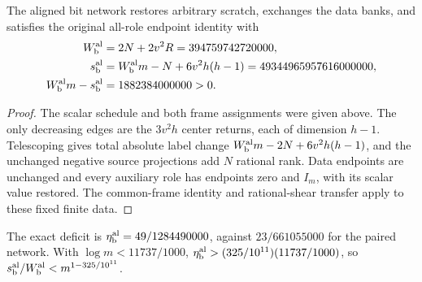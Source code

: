 \begin{proposition}\label{prop:aligned-bit-interface}
The aligned bit network restores arbitrary scratch, exchanges the data banks,
and satisfies the original all-role endpoint identity with
\begin{align*}
 W_{\rm b}^{\rm al}&=2N+2v^2R=394759742720000,\\
 s_{\rm b}^{\rm al}&=W_{\rm b}^{\rm al}m-N+6v^2h(h-1)
                         =49344965957616000000,\\
 W_{\rm b}^{\rm al}m-s_{\rm b}^{\rm al}&=1882384000000>0.
\end{align*}
\end{proposition}

\begin{proof}
The scalar schedule and both frame assignments were given above. The only
decreasing edges are the $3v^2h$ center returns, each of dimension $h-1$.
Telescoping gives total absolute label change
$W_{\rm b}^{\rm al}m-2N+6v^2h(h-1)$, and the unchanged negative source
projections add $N$ rational rank. Data endpoints are unchanged and every
auxiliary role has endpoints zero and $I_m$, with its scalar value restored.
The common-frame identity and rational-shear transfer apply to these fixed
finite data.
\end{proof}

The exact deficit is $\eta_{\rm b}^{\rm al}=49/1284490000$, against
$23/661055000$ for the paired network. With $\log m<11737/1000$,
$\eta_{\rm b}^{\rm al}>(325/10^{11})(11737/1000)$, so
$s_{\rm b}^{\rm al}/W_{\rm b}^{\rm al}<m^{1-325/10^{11}}$.
